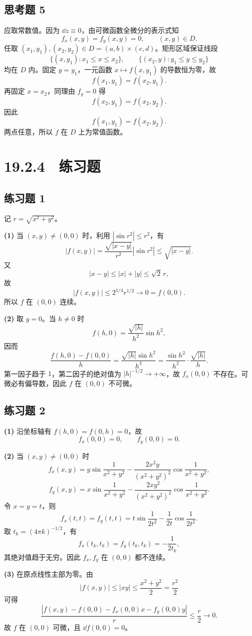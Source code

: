 \subsection*{思考题 5}
\begin{xsolution}
应取常数值。因为 $\dd z\equiv0$，由可微函数全微分的表示式知
\[
  f_x(x,y)=f_y(x,y)=0,
  \qquad (x,y)\in D.
\]
任取 $(x_1,y_1),(x_2,y_2)\in D=(a,b)\times(c,d)$。矩形区域保证线段
\[
  \{(x,y_1):x_1\le x\le x_2\},
  \qquad
  \{(x_2,y):y_1\le y\le y_2\}
\]
均在 $D$ 内。固定 $y=y_1$，一元函数 $x\mapsto f(x,y_1)$ 的导数恒为零，故
\[
  f(x_1,y_1)=f(x_2,y_1).
\]
再固定 $x=x_2$，同理由 $f_y=0$ 得
\[
  f(x_2,y_1)=f(x_2,y_2).
\]
因此
\[
  f(x_1,y_1)=f(x_2,y_2).
\]
两点任意，所以 $f$ 在 $D$ 上为常值函数。
\end{xsolution}

\section*{19.2.4　练习题}

\subsection*{练习题 1}
\begin{xsolution}
记 $r=\sqrt{x^2+y^2}$。

\textbf{(1)} 当 $(x,y)\ne(0,0)$ 时，利用 $|\sin r^2|\le r^2$，有
\[
  |f(x,y)|
  =\frac{\sqrt{|x-y|}}{r^2}|\sin r^2|
  \le\sqrt{|x-y|}.
\]
又
\[
  |x-y|\le |x|+|y|\le\sqrt2\,r,
\]
故
\[
  |f(x,y)|\le 2^{1/4}r^{1/2}\to0=f(0,0).
\]
所以 $f$ 在 $(0,0)$ 连续。

\textbf{(2)} 取 $y=0$。当 $h\ne0$ 时
\[
  f(h,0)=\frac{\sqrt{|h|}}{h^2}\sin h^2,
\]
因而
\[
  \frac{f(h,0)-f(0,0)}h
  =\frac{\sqrt{|h|}\sin h^2}{h^3}
  =\frac{\sin h^2}{h^2}\cdot\frac{\sqrt{|h|}}h.
\]
第一因子趋于 $1$，第二因子的绝对值为 $|h|^{-1/2}\to+\infty$，故 $f_x(0,0)$ 不存在。可微必有偏导数，因此 $f$ 在 $(0,0)$ 不可微。
\end{xsolution}

\subsection*{练习题 2}
\begin{xsolution}
\textbf{(1)} 沿坐标轴有 $f(h,0)=f(0,h)=0$，故
\[
  f_x(0,0)=0,
  \qquad
  f_y(0,0)=0.
\]

\textbf{(2)} 当 $(x,y)\ne(0,0)$ 时
\[
  f_x(x,y)=y\sin\frac1{x^2+y^2}
  -\frac{2x^2y}{(x^2+y^2)^2}\cos\frac1{x^2+y^2},
\]
\[
  f_y(x,y)=x\sin\frac1{x^2+y^2}
  -\frac{2xy^2}{(x^2+y^2)^2}\cos\frac1{x^2+y^2}.
\]
令 $x=y=t$，则
\[
  f_x(t,t)=f_y(t,t)
  =t\sin\frac1{2t^2}-\frac1{2t}\cos\frac1{2t^2}.
\]
取 $t_k=(4\pi k)^{-1/2}$，有
\[
  f_x(t_k,t_k)=f_y(t_k,t_k)=-\frac1{2t_k},
\]
其绝对值趋于无穷。因此 $f_x,f_y$ 在 $(0,0)$ 都不连续。

\textbf{(3)} 在原点线性主部为零。由
\[
  |f(x,y)|\le|xy|\le\frac{x^2+y^2}{2}=\frac{r^2}{2}
\]
可得
\[
  \frac{|f(x,y)-f(0,0)-f_x(0,0)x-f_y(0,0)y|}{r}
  \le\frac r2\to0.
\]
故 $f$ 在 $(0,0)$ 可微，且 $\dd f(0,0)=0$。
\end{xsolution}

